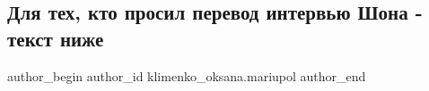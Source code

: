  
 
 
 
 

\subsection{Для тех, кто просил перевод интервью Шона - текст ниже}
\label{sec:30_09_2022.fb.klimenko_oksana.mariupol.1.dlya_tekh__kto_prosi}

\ifcmt
 author_begin
   author_id klimenko_oksana.mariupol
 author_end
\fi
